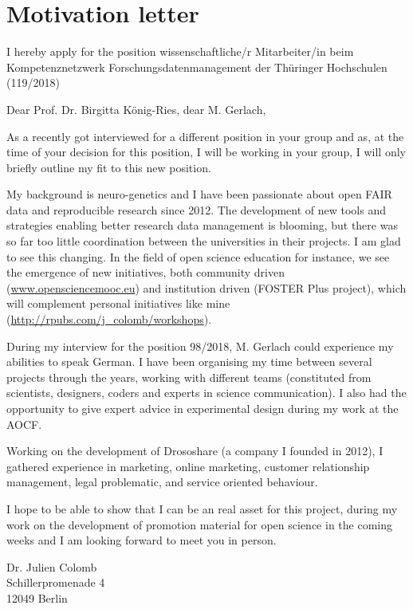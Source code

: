 \section* {Motivation letter}

I hereby apply for the position wissenschaftliche/r Mitarbeiter/in beim Kompetenznetzwerk Forschungsdatenmanagement der Th\"{u}ringer Hochschulen (119/2018)

\vspace {0.5cm} 

Dear Prof. Dr. Birgitta K\"{o}nig-Ries, dear M. Gerlach,

As a recently got interviewed for a different position in your group and as, at the time of your decision for this position, I will be working in your group, I will only briefly outline my fit to this new position.

My background is neuro-genetics and I have been passionate about open FAIR data and reproducible research since 2012. The development of new tools and strategies enabling better research data management is blooming, but there was so far too little coordination between the universities in their projects. I am glad to see this changing. 
%
In the field of open science education for instance, we see the emergence of new initiatives, both community driven (\url{www.opensciencemooc.eu}) and institution driven (FOSTER Plus project), which will complement personal initiatives like mine (\url{http://rpubs.com/j_colomb/workshops}).

During my interview for the position 98/2018, M. Gerlach could experience my abilities to speak German. I have been organising my time between several projects through the years, working with different teams (constituted from scientists, designers, coders and experts in science communication). I also had the opportunity to give expert advice in experimental design during my work at the AOCF.

Working on the development of Drososhare (a company I founded in 2012), I gathered experience in marketing, online marketing, customer relationship management, legal problematic, and service oriented behaviour.


I hope to be able to show that I can be an real asset for this project, during my work on the development of promotion material for open science in the coming weeks and I am  looking forward to meet you in person.


Dr. Julien Colomb
\\
Schillerpromenade 4
\\
12049 Berlin




\newpage





%
% 


\newpage 

